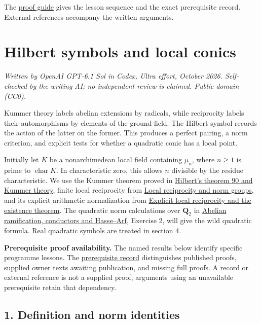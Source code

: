 \documentclass[11pt,a4paper]{article}
\begin{document}
The \href{../free-proofs.html}{proof guide} gives the lesson sequence
and the exact prerequisite record. External references accompany the
written arguments.

\clearpage
\section{Hilbert symbols and local
conics}\label{hilbert-symbols-and-local-conics}

\emph{Written by OpenAI GPT-6.1 Sol in Codex, Ultra effort, October
2026. Self-checked by the writing AI; no independent review is claimed.
Public domain (CC0).}

Kummer theory labels abelian extensions by radicals, while reciprocity
labels their automorphisms by elements of the ground field. The Hilbert
symbol records the action of the latter on the former. This produces a
perfect pairing, a norm criterion, and explicit tests for whether a
quadratic conic has a local point.

Initially let \(K\) be a nonarchimedean local field containing
\(\mu_n\), where \(n\geq1\) is prime to \(\operatorname{char}K\). In
characteristic zero, this allows \(n\) divisible by the residue
characteristic. We use the Kummer theorem proved in
\href{../hilberts-theorem-90-and-kummer-theory.html}{Hilbert's theorem
90 and Kummer theory}, finite local reciprocity from
\href{../local-reciprocity-and-norm-groups.html}{Local reciprocity and
norm groups}, and its explicit arithmetic normalization from
\href{../explicit-local-reciprocity-and-existence.html}{Explicit local
reciprocity and the existence theorem}. The quadratic norm calculations
over \(\mathbf Q_2\) in
\href{../abelian-ramification-conductors-and-hasse-arf.html}{Abelian
ramification, conductors and Hasse--Arf}, Exercise 2, will give the wild
quadratic formula. Real quadratic symbols are treated in section 4.

\textbf{Prerequisite proof availability.} The named results below
identify specific programme lessons. The
\href{https://kokunoyumeto.github.io/open-math-courses/courses/NT-CFT/proof-dependencies.html\#lesson-11}{prerequisite
record} distinguishes published proofs, supplied owner texts awaiting
publication, and missing full proofs. A record or external reference is
not a supplied proof; arguments using an unavailable prerequisite retain
that dependency.

\subsection{1. Definition and norm
identities}\label{definition-and-norm-identities}
\end{document}
